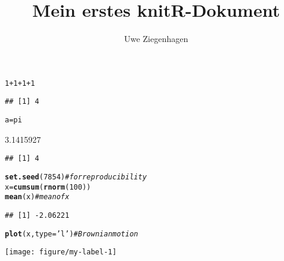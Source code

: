 \documentclass[12pt,ngerman]{scrartcl}\usepackage[]{graphicx}\usepackage[]{xcolor}
\author{Uwe Ziegenhagen}
\title{Mein erstes knitR-Dokument}
\makeatletter
\def\maxwidth{ %
  \ifdim\Gin@nat@width>\linewidth
    \linewidth
  \else
    \Gin@nat@width
  \fi
}
\newcommand{\hlnum}[1]{\textcolor[rgb]{0.686,0.059,0.569}{#1}}%
\newcommand{\hlstr}[1]{\textcolor[rgb]{0.192,0.494,0.8}{#1}}%
\newcommand{\hlcom}[1]{\textcolor[rgb]{0.678,0.584,0.686}{\textit{#1}}}%
\newcommand{\hlopt}[1]{\textcolor[rgb]{0,0,0}{#1}}%
\newcommand{\hlstd}[1]{\textcolor[rgb]{0.345,0.345,0.345}{#1}}%
\newcommand{\hlkwb}[1]{\textcolor[rgb]{0.69,0.353,0.396}{#1}}%
\newcommand{\hlkwc}[1]{\textcolor[rgb]{0.333,0.667,0.333}{#1}}%
\newcommand{\hlkwd}[1]{\textcolor[rgb]{0.737,0.353,0.396}{\textbf{#1}}}%
\newenvironment{kframe}{%
 \def\at@end@of@kframe{}%
 \ifinner\ifhmode%
  \def\at@end@of@kframe{\end{minipage}}%
  \begin{minipage}{\columnwidth}%
 \fi\fi%
 \def\FrameCommand##1{\hskip\@totalleftmargin \hskip-\fboxsep
 \colorbox{shadecolor}{##1}\hskip-\fboxsep
     \hskip-\linewidth \hskip-\@totalleftmargin \hskip\columnwidth}%
 \MakeFramed {\advance\hsize-\width
   \@totalleftmargin\z@ \linewidth\hsize
   \@setminipage}}%
 {\par\unskip\endMakeFramed%
 \at@end@of@kframe}
\newenvironment{knitrout}{}{} %
\makeatother
\begin{document}
\maketitle


\begin{knitrout}
\color{fgcolor}\begin{kframe}
\begin{alltt}
\hlnum{1}\hlopt{+}\hlnum{1}\hlopt{+}\hlnum{1}\hlopt{+}\hlnum{1}
\end{alltt}
\begin{verbatim}
## [1] 4
\end{verbatim}
\begin{alltt}
\hlstd{a}\hlkwb{=}\hlstd{pi}
\end{alltt}
\end{kframe}
\end{knitrout}

3.1415927


\begin{knitrout}
\color{fgcolor}\begin{kframe}
\begin{verbatim}
## [1] 4
\end{verbatim}
\end{kframe}
\end{knitrout}


\begin{knitrout}
\color{fgcolor}\begin{kframe}
\begin{alltt}
\hlkwd{set.seed}\hlstd{(}\hlnum{7854}\hlstd{)}  \hlcom{# for reproducibility}
\hlstd{x} \hlkwb{=} \hlkwd{cumsum}\hlstd{(}\hlkwd{rnorm}\hlstd{(}\hlnum{100}\hlstd{))}
\hlkwd{mean}\hlstd{(x)}  \hlcom{# mean of x}
\end{alltt}
\begin{verbatim}
## [1] -2.06221
\end{verbatim}
\begin{alltt}
\hlkwd{plot}\hlstd{(x,} \hlkwc{type} \hlstd{=} \hlstr{'l'}\hlstd{)}  \hlcom{# Brownian motion}
\end{alltt}
\end{kframe}
\texttt{[image: figure/my-label-1]} 
\end{knitrout}
\end{document}
